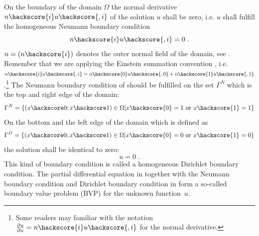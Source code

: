 On the boundary of the domain $\Omega$ the normal derivative $n\hackscore{i} u\hackscore{,i}$
of the solution $u$ shall be zero, i.e. $u$ shall fulfill
the homogeneous Neumann boundary condition
\begin{equation}
n\hackscore{i} u\hackscore{,i}= 0 \;.
\label{eq:FirstSteps.2}
\end{equation}
$n=(n\hackscore{i})$ denotes the outer normal field
of the domain, see . Remember that we 
are applying the Einstein summation convention , i.e. $n\hackscore{i} u\hackscore{,i}= n\hackscore{0} u\hackscore{,0} +%
n\hackscore{1} u\hackscore{,1}$.\footnote{Some readers may familiar with the
notation $\frac{\partial u}{\partial n} = n\hackscore{i} u\hackscore{,i}$
for the normal derivative.}
The Neumann boundary condition of  should be fulfilled on the
set $\Gamma^N$ which is the top and right edge of the domain:
\begin{equation}
    \Gamma^N=\{(x\hackscore 0;x\hackscore 1) \in \Omega | x\hackscore{0}=1 \mbox{ or } x\hackscore{1}=1  \}
    \label{eq:FirstSteps.2b}
\end{equation}
On the bottom and the left edge of the domain which is defined
as 
\begin{equation}
    \Gamma^D=\{(x\hackscore 0;x\hackscore 1) \in \Omega | x\hackscore{0}=0 \mbox{ or } x\hackscore{1}=0  \}
    \label{eq:FirstSteps.2c}
\end{equation}
the solution shall be identical to zero:
\begin{equation}
    u=0 \; .
    \label{eq:FirstSteps.2d}
\end{equation}
This kind of boundary condition is called a homogeneous Dirichlet boundary
condition.
The partial differential equation in  together
with the Neumann boundary condition  and 
Dirichlet boundary condition in  form a so-called
boundary value
problem (BVP)
for the unknown function~$u$. 


